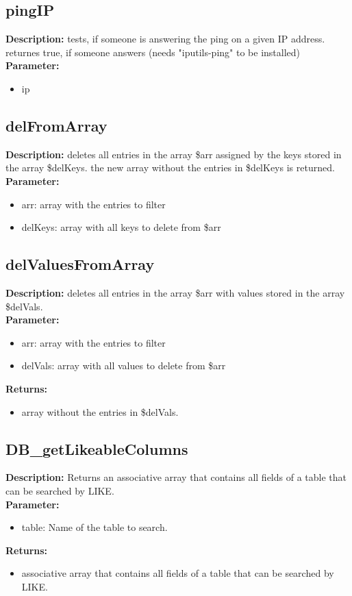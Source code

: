 \subsection{pingIP}
\textbf{Description:} tests, if someone is answering the ping on a given IP address. returnes true, if someone answers (needs "iputils-ping" to be installed)\\
\textbf{Parameter:}
\begin{itemize}
\item ip
\end{itemize}

\subsection{delFromArray}
\textbf{Description:} deletes all entries in the array \$arr assigned by the keys stored in the array \$delKeys. the new array without the entries in \$delKeys is returned.\\
\textbf{Parameter:}
\begin{itemize}
\item arr: array with the entries to filter
\item delKeys: array with all keys to delete from \$arr
\end{itemize}

\subsection{delValuesFromArray}
\textbf{Description:} deletes all entries in the array \$arr with values stored in the array \$delVals.\\
\textbf{Parameter:}
\begin{itemize}
\item arr: array with the entries to filter
\item delVals: array with all values to delete from \$arr
\end{itemize}
\textbf{Returns:}
\begin{itemize}
\item array without the entries in \$delVals.
\end{itemize}

\subsection{DB\_getLikeableColumns}
\textbf{Description:} Returns an associative array that contains all fields of a table that can be searched by LIKE.\\
\textbf{Parameter:}
\begin{itemize}
\item table: Name of the table to search.
\end{itemize}
\textbf{Returns:}
\begin{itemize}
\item associative array that contains all fields of a table that can be searched by LIKE.
\end{itemize}

